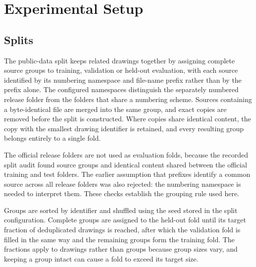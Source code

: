 \chapter{Experimental Setup}
\label{ch:experiments}

\section{Splits}
\label{sec:splits}
The public-data split keeps related drawings together by assigning complete source
groups to training, validation or held-out evaluation, with each source identified
by its numbering namespace and file-name prefix rather than by the prefix alone.
The configured namespaces distinguish the separately numbered release folder from
the folders that share a numbering scheme.
Sources containing a byte-identical file are merged into the same group, and exact
copies are removed before the split is constructed.
Where copies share identical content, the copy with the smallest drawing identifier
is retained, and every resulting group belongs entirely to a single fold.

The official release folders are not used as evaluation folds, because the recorded
split audit found source groups and identical content shared between the official
training and test folders.
The earlier assumption that prefixes identify a common source across all release
folders was also rejected: the numbering namespace is needed to interpret them.
These checks establish the grouping rule used here.

Groups are sorted by identifier and shuffled using the seed stored in the split
configuration.
Complete groups are assigned to the held-out fold until its target fraction of
deduplicated drawings is reached, after which the validation fold is filled in the
same way and the remaining groups form the training fold.
The fractions apply to drawings rather than groups because group sizes vary, and
keeping a group intact can cause a fold to exceed its target size.

